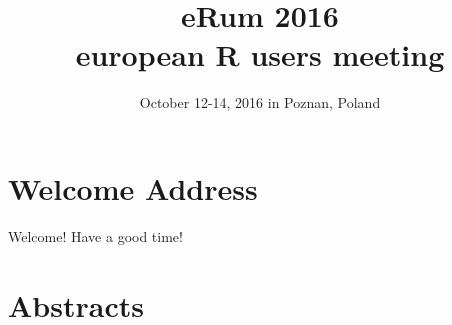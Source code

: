 \documentclass[11pt]{book}
\title{eRum 2016 \\ european R users meeting}
\author{October 12-14, 2016 in Poznan, Poland}
\date{}
\begin{document}
\frontmatter
\maketitle

\chapter{Welcome Address}
Welcome! Have a good time!

\tableofcontents

\mainmatter

\chapter{Abstracts}




\backmatter
\end{document}
